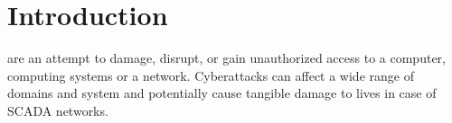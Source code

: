 \documentclass[9pt,journal,compsoc]{IEEEtran}
\begin{document}
%
\IEEEpeerreviewmaketitle



\section{Introduction}
\label{section:intro}
%
%



% 
% 
% 
% 
 are an attempt to damage, disrupt, or gain unauthorized access to a computer, computing systems or a network. Cyberattacks can affect a wide range of domains and system and potentially cause tangible damage to lives in case of SCADA networks.
\end{document}
